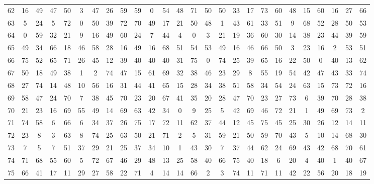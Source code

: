 \begin{table}
\begin{tabular}{c c c c c c c c c c c c c c c c c c c c c c c c c c }
62 & 16 & 49 & 47 & 50 & 3 & 47 & 26 & 59 & 59 & 0 & 54 & 48 & 71 & 50 & 50 & 33 & 17 & 73 & 60 & 48 & 15 & 60 & 16 & 27 & 66 \\
63 & 5 & 24 & 5 & 72 & 0 & 50 & 39 & 72 & 70 & 49 & 17 & 21 & 50 & 48 & 1 & 43 & 61 & 33 & 51 & 9 & 68 & 52 & 28 & 50 & 53 \\
64 & 0 & 59 & 32 & 21 & 9 & 16 & 49 & 60 & 24 & 7 & 44 & 4 & 0 & 3 & 21 & 19 & 36 & 60 & 30 & 14 & 38 & 23 & 44 & 39 & 59 \\
65 & 49 & 34 & 66 & 18 & 46 & 58 & 28 & 16 & 49 & 16 & 68 & 51 & 54 & 53 & 49 & 16 & 46 & 66 & 50 & 3 & 23 & 16 & 2 & 53 & 51 \\
66 & 75 & 52 & 65 & 71 & 26 & 45 & 12 & 39 & 40 & 40 & 40 & 31 & 75 & 0 & 74 & 25 & 39 & 65 & 16 & 22 & 50 & 0 & 40 & 13 & 62 \\
67 & 50 & 18 & 49 & 38 & 1 & 2 & 74 & 47 & 15 & 61 & 69 & 32 & 38 & 46 & 23 & 29 & 8 & 55 & 19 & 54 & 42 & 47 & 43 & 33 & 74 \\
68 & 27 & 74 & 14 & 48 & 10 & 56 & 16 & 31 & 44 & 41 & 65 & 15 & 28 & 34 & 38 & 51 & 58 & 34 & 54 & 24 & 63 & 15 & 73 & 72 & 16 \\
69 & 58 & 47 & 24 & 70 & 7 & 38 & 45 & 70 & 23 & 20 & 67 & 41 & 35 & 20 & 28 & 47 & 70 & 23 & 27 & 73 & 6 & 39 & 70 & 28 & 38 \\
70 & 21 & 23 & 16 & 69 & 55 & 49 & 14 & 69 & 63 & 42 & 34 & 0 & 9 & 25 & 5 & 42 & 69 & 46 & 72 & 21 & 1 & 49 & 69 & 73 & 2 \\
71 & 74 & 58 & 6 & 66 & 6 & 34 & 37 & 26 & 75 & 17 & 72 & 11 & 62 & 37 & 44 & 12 & 45 & 75 & 45 & 25 & 30 & 26 & 12 & 14 & 11 \\
72 & 23 & 8 & 3 & 63 & 8 & 74 & 25 & 63 & 50 & 21 & 71 & 2 & 5 & 31 & 59 & 21 & 50 & 59 & 70 & 43 & 5 & 10 & 14 & 68 & 30 \\
73 & 7 & 5 & 7 & 51 & 37 & 29 & 21 & 25 & 37 & 34 & 10 & 1 & 43 & 30 & 7 & 37 & 44 & 62 & 24 & 69 & 43 & 42 & 68 & 70 & 61 \\
74 & 71 & 68 & 55 & 60 & 5 & 72 & 67 & 46 & 29 & 48 & 13 & 25 & 58 & 40 & 66 & 75 & 40 & 18 & 6 & 20 & 4 & 40 & 1 & 40 & 67 \\
75 & 66 & 41 & 17 & 11 & 29 & 27 & 58 & 22 & 71 & 4 & 14 & 14 & 66 & 2 & 3 & 74 & 11 & 71 & 11 & 42 & 22 & 56 & 20 & 18 & 19 \\
\hline
\end{tabular}
\end{table}